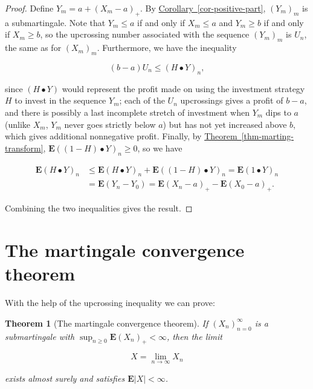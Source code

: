 \documentclass[11pt]{report}
\theoremstyle{plain}
\newtheorem{thm}{Theorem}[chapter]
\theoremstyle{definition}
\begin{document}
\begin{proof}
Define $Y_m = a+(X_m-a)_+$. By \texorpdfstring{\hyperref[cor-positive-part]{Corollary~\ref*{cor-positive-part}}}{Corollary}, $(Y_m)_m$ is a submartingale.
Note that $Y_m\le a$ if and only if $X_m\le a$ and
$Y_m\ge b$ if and only if $X_m\ge b$, so the
upcrossing number associated with the sequence
$(Y_m)_m$ is $U_n$, the same as for $(X_m)_m$.
Furthermore, we have the inequality

\[
(b-a)U_n \le (H\bullet Y)_n,
\]

\noindent since $(H\bullet Y)$ would represent the profit made
on using the investment strategy $H$ to invest in the
sequence $Y_m$; each of the $U_n$ upcrossings gives a
profit of $b-a$, and there is possibly a last
incomplete stretch of investment when $Y_m$ dips to
$a$ (unlike $X_m$, $Y_m$ never goes strictly below
$a$) but has not yet increased above $b$, which gives
additional nonnegative profit. Finally, by \texorpdfstring{\hyperref[thm-marting-transform]{Theorem~\ref*{thm-marting-transform}}}{Theorem},
$\mathbf{E}((1-H)\bullet Y)_n\ge 0$, so we have

\begin{align*}
\mathbf{E}(H\bullet Y)_n &\le \mathbf{E}(H\bullet Y)_n + \mathbf{E}((1-H)\bullet Y)_n = \mathbf{E}(1\bullet Y)_n \\ &= \mathbf{E}(Y_n-Y_0) = \mathbf{E}(X_n-a)_+ - \mathbf{E}(X_0-a)_+.
\end{align*}

\noindent Combining the two inequalities gives the result.
\end{proof}

\section{The martingale convergence theorem}

With the help of the upcrossing inequality we can
prove:

\begin{thm}[The martingale convergence theorem]
If $(X_n)_{n=0}^\infty$ is a submartingale with
$\sup_{n\ge 0}\mathbf{E} (X_n)_+ < \infty$, then the
limit

\[
X = \lim_{n\to\infty} X_n
\]

\noindent exists almost surely and satisfies
$\mathbf{E}|X|<\infty$.
\end{thm}
\end{document}
